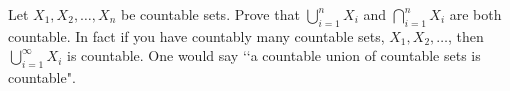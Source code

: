 Let $X_1, X_2, \ldots, X_n$ be countable sets. Prove that
$\bigcup_{i=1}^n X_i$ and $\bigcap_{i=1}^n X_i$ are both
countable.
In fact if you have countably many countable sets,
$X_1, X_2, \ldots$, then
$\bigcup_{i=1}^\infty X_i$ is countable.
One would say
\lq\lq a countable union of countable sets is countable".
